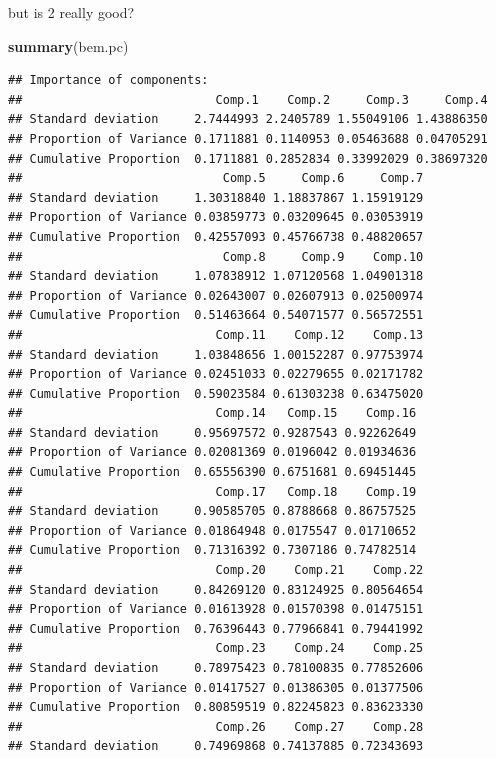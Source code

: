 \documentclass[ignorenonframetext,]{beamer}
\newenvironment{Shaded}{\begin{snugshade}}{\end{snugshade}}
\newcommand{\KeywordTok}[1]{\textcolor[rgb]{0.13,0.29,0.53}{\textbf{#1}}}
\newcommand{\NormalTok}[1]{#1}
\begin{document}
\begin{frame}[fragile]{but is 2 really good?}
\protect\hypertarget{but-is-2-really-good}{}

\scriptsize

\begin{Shaded}
\begin{Highlighting}[]
\KeywordTok{summary}\NormalTok{(bem.pc)}
\end{Highlighting}
\end{Shaded}

\begin{verbatim}
## Importance of components:
##                           Comp.1    Comp.2     Comp.3     Comp.4
## Standard deviation     2.7444993 2.2405789 1.55049106 1.43886350
## Proportion of Variance 0.1711881 0.1140953 0.05463688 0.04705291
## Cumulative Proportion  0.1711881 0.2852834 0.33992029 0.38697320
##                            Comp.5     Comp.6     Comp.7
## Standard deviation     1.30318840 1.18837867 1.15919129
## Proportion of Variance 0.03859773 0.03209645 0.03053919
## Cumulative Proportion  0.42557093 0.45766738 0.48820657
##                            Comp.8     Comp.9    Comp.10
## Standard deviation     1.07838912 1.07120568 1.04901318
## Proportion of Variance 0.02643007 0.02607913 0.02500974
## Cumulative Proportion  0.51463664 0.54071577 0.56572551
##                           Comp.11    Comp.12    Comp.13
## Standard deviation     1.03848656 1.00152287 0.97753974
## Proportion of Variance 0.02451033 0.02279655 0.02171782
## Cumulative Proportion  0.59023584 0.61303238 0.63475020
##                           Comp.14   Comp.15    Comp.16
## Standard deviation     0.95697572 0.9287543 0.92262649
## Proportion of Variance 0.02081369 0.0196042 0.01934636
## Cumulative Proportion  0.65556390 0.6751681 0.69451445
##                           Comp.17   Comp.18    Comp.19
## Standard deviation     0.90585705 0.8788668 0.86757525
## Proportion of Variance 0.01864948 0.0175547 0.01710652
## Cumulative Proportion  0.71316392 0.7307186 0.74782514
##                           Comp.20    Comp.21    Comp.22
## Standard deviation     0.84269120 0.83124925 0.80564654
## Proportion of Variance 0.01613928 0.01570398 0.01475151
## Cumulative Proportion  0.76396443 0.77966841 0.79441992
##                           Comp.23    Comp.24    Comp.25
## Standard deviation     0.78975423 0.78100835 0.77852606
## Proportion of Variance 0.01417527 0.01386305 0.01377506
## Cumulative Proportion  0.80859519 0.82245823 0.83623330
##                           Comp.26    Comp.27    Comp.28
## Standard deviation     0.74969868 0.74137885 0.72343693

\end{verbatim}
\end{frame}
\end{document}

